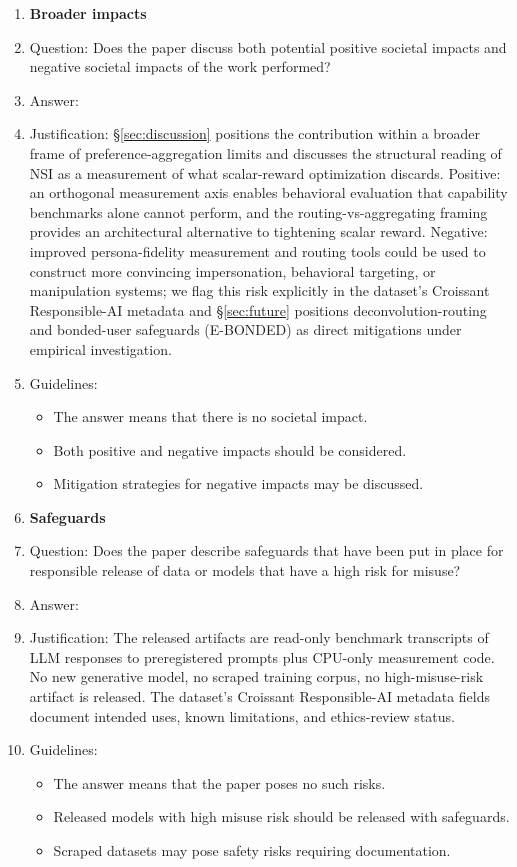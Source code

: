 \begin{enumerate}
\item {\bf Broader impacts}
    \item[] Question: Does the paper discuss both potential positive societal impacts and negative societal impacts of the work performed?
    \item[] Answer: \answerYes{}
    \item[] Justification: \S\ref{sec:discussion} positions the contribution within a broader frame of preference-aggregation limits and discusses the structural reading of NSI as a measurement of what scalar-reward optimization discards. Positive: an orthogonal measurement axis enables behavioral evaluation that capability benchmarks alone cannot perform, and the routing-vs-aggregating framing provides an architectural alternative to tightening scalar reward. Negative: improved persona-fidelity measurement and routing tools could be used to construct more convincing impersonation, behavioral targeting, or manipulation systems; we flag this risk explicitly in the dataset's Croissant Responsible-AI metadata and \S\ref{sec:future} positions deconvolution-routing and bonded-user safeguards (E-BONDED) as direct mitigations under empirical investigation.
    \item[] Guidelines:
    \begin{itemize}
        \item The answer \answerNA{} means that there is no societal impact.
        \item Both positive and negative impacts should be considered.
        \item Mitigation strategies for negative impacts may be discussed.
    \end{itemize}

\item {\bf Safeguards}
    \item[] Question: Does the paper describe safeguards that have been put in place for responsible release of data or models that have a high risk for misuse?
    \item[] Answer: \answerNA{}
    \item[] Justification: The released artifacts are read-only benchmark transcripts of LLM responses to preregistered prompts plus CPU-only measurement code. No new generative model, no scraped training corpus, no high-misuse-risk artifact is released. The dataset's Croissant Responsible-AI metadata fields document intended uses, known limitations, and ethics-review status.
    \item[] Guidelines:
    \begin{itemize}
        \item The answer \answerNA{} means that the paper poses no such risks.
        \item Released models with high misuse risk should be released with safeguards.
        \item Scraped datasets may pose safety risks requiring documentation.
    \end{itemize}


\end{enumerate}
